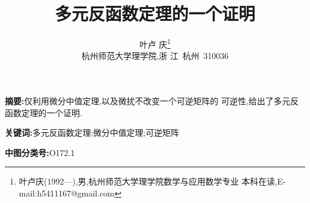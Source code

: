 \documentclass[twoside,11pt]{article}
\begin{document}
\title{\huge{\textbf{多元反函数定理的一个证明}}} \author{\small{叶卢
    庆\footnote{叶卢庆(1992---),男,杭州师范大学理学院数学与应用数学专业
      本科在读,E-mail:h5411167@gmail.com}}\\{\small{杭州师范大学理学院,浙
      江~杭州~310036}}} \date{}
\maketitle
  


\textbf{\small{摘要}:}仅利用微分中值定理,以及微扰不改变一个可逆矩阵的
可逆性,给出了多元反函数定理的一个证明. \smallskip

\textbf{\small{关键词}:}多元反函数定理;微分中值定理;可逆矩阵\smallskip

\textbf{\small{中图分类号}:}O172.1
  
\vspace{30pt} %
  
\end{document}

